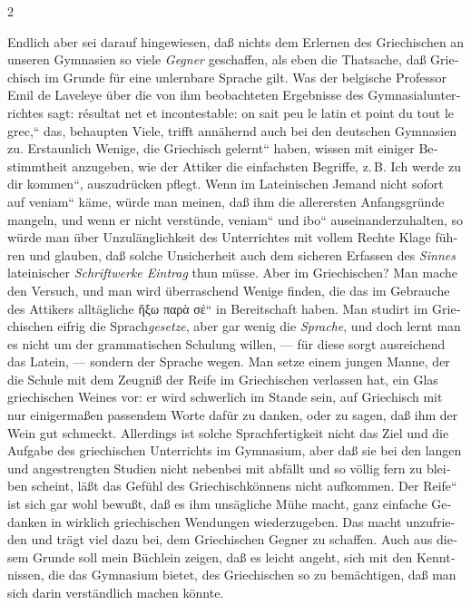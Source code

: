 \begin{paracol}{2}
\begin{german}
Endlich aber sei darauf hingewiesen, daß nichts dem Erlernen des
Griechischen an unseren Gymnasien so viele \emph{Gegner} geschaffen,
als eben die Thatsache, daß Griechisch im Grunde für eine unlernbare
Sprache gilt. Was der belgische Professor Emil de Laveleye über die
von ihm beobachteten Ergebnisse des Gymnasialunterrichtes
sagt: \quotedblbase \textfrench{résultat net et incontestable: on
sait peu le latin et point du tout le grec,}`` das, behaupten Viele,
trifft annähernd auch bei den deutschen Gymnasien zu. Erstaunlich
Wenige, die \quotedblbase Griechisch gelernt`` haben, wissen mit
einiger Bestimmtheit anzugeben, wie der Attiker
die einfachsten Begriffe, z.\,B. \quotedblbase Ich werde zu dir
kommen``, auszudrücken pflegt. Wenn im Lateinischen
Jemand nicht sofort auf \quotedblbase \textlatin{veniam}`` käme,
würde man meinen, daß ihm die allerersten Anfangsgründe
mangeln, und wenn er nicht verstünde, \quotedblbase \textlatin{veniam}``
und \quotedblbase \textlatin{ibo}`` auseinanderzuhalten,
so würde man über Unzulänglichkeit des Unterrichtes mit vollem Rechte
Klage führen und glauben, daß solche Unsicherheit auch dem sicheren
Erfassen des \emph{Sinnes} lateinischer \emph{Schriftwerke Eintrag
}thun müsse. Aber  im Griechischen? Man mache den Versuch, und man
wird überraschend Wenige finden, die das im Gebrauche des Attikers
alltägliche \quotedblbase \textgreek[variant=ancient]{ἥξω παρὰ σέ}``
in Bereitschaft haben. Man
studirt im Griechischen eifrig die Sprach\emph{gesetze}, aber gar
wenig die \emph{Sprache}, und doch lernt man es nicht um der grammatischen
Schulung willen, --- für diese sorgt ausreichend
das Latein, --- sondern der Sprache wegen. Man setze einem jungen
Manne, der die Schule  mit dem Zeugniß der Reife im Griechischen
verlassen hat, ein Glas griechischen Weines vor: er wird schwerlich
im Stande sein, auf Griechisch mit nur einigermaßen passendem Worte
dafür zu danken, oder zu sagen, daß ihm der Wein gut schmeckt. Allerdings
ist solche Sprachfertigkeit nicht das Ziel und die Aufgabe des griechischen
Unterrichts im Gymnasium, aber daß sie bei den langen und angestrengten
Studien nicht nebenbei mit abfällt und so völlig fern zu bleiben
scheint, läßt das Gefühl des Griechischkönnens nicht aufkommen. Der
\quotedblbase Reife`` ist sich gar wohl bewußt, daß es ihm unsägliche
Mühe macht, ganz einfache Gedanken in wirklich griechischen Wendungen
wiederzugeben. Das macht unzufrieden und trägt viel dazu bei, dem
Griechischen Gegner zu schaffen. Auch aus diesem Grunde soll mein
Büchlein zeigen, daß es leicht angeht, sich mit den Kenntnissen,
die das Gymnasium bietet, des Griechischen so zu bemächtigen, daß
man sich darin verständlich machen könnte. 
\end{german}
\switchcolumn


\end{paracol}
